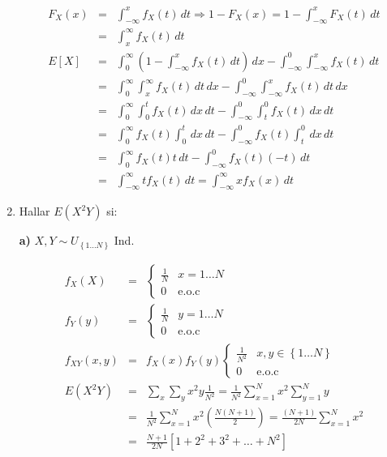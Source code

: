 \begin{enumerate}
\begin{eqnarray*} 
F_{X}\left(x \right)&=& \int_{-\infty}^{x} f_{X}\left(t \right)\, dt \Rightarrow 1-F_{X}\left( x\right)= 1 -\int_{-\infty}^{x}F_{X}\left( t\right) \, dt\\
&=& \int_{x}^{\infty} f_{X} \left( t\right)\, dt\\
E \left[X \right]&=& \int_{0}^{\infty} \left(1 - \int _{-\infty}^{x} f_{X} \left(t \right)\, dt\right)\, dx - \int_{-\infty}^{0}\int_{-\infty}^{x} f_{X} \left(t \right)\, dt\\
&=& \int_{0}^{\infty} \int_{x}^{\infty} f_{X}\left(t \right)\, dt\,dx - \int_{-\infty}^{0} \int_{-\infty}^{x} f_{X}\left(t \right)\, dt\,dx\\
&=& \int_{0}^{\infty} \int_{0}^{t} f_{X}\left(t \right)\, dx\,dt - \int_{-\infty}^{0} \int_{t}^{0} f_{X}\left(t \right)\, dx\,dt\\
&=&\int_{0}^{\infty}f_{X}\left(t \right) \int_{0}^{t} \, dx\,dt - \int_{-\infty}^{0}f_{X}\left(t \right) \int_{t}^{0} \, dx\,dt\\
&=&\int_{0}^{\infty}f_{X}\left(t \right)t \,dt - \int_{-\infty}^{0}f_{X}\left(t \right)\left(-t \right) \,dt\\
&=& \int_{-\infty}^{\infty} tf_{X}\left(t\right) \, dt = \int_{-\infty}^{\infty} x f_{X} \left(x \right)\, dt
\end{eqnarray*} 
 \item Hallar $E \left(X^2 Y \right)$ si:
 
 \smallskip
 
 \textbf{a)} $X,Y \sim U_{\left\{1 \ldots N \right\}}$ Ind.
 
 \begin{eqnarray*}
 f_{X} \left(X \right)&=& \begin{cases}
 \frac{1}{N} & x=1 \ldots N\\
 0 & \textrm{e.o.c}
 \end{cases}\\
  f_{Y} \left(y \right)&=&
 \begin{cases}
 \frac{1}{N} & y=1 \ldots N\\
 0 & \textrm{e.o.c}
 \end{cases}\\
 f_{XY} \left(x,y \right)&=& f_{X} \left(x \right)f_{Y} \left(y \right)
 \begin{cases}
 \frac{1}{N^2} & x,y \in \left\{ 1 \ldots N \right\} \\
 0 & \textrm{e.o.c}
 \end{cases}\\
 E \left(X^2 Y \right) &=& \sum_{x}\sum_{y} x^{2}y \frac{1}{N^2} = \frac{1}{N^2}\sum_{x=1}^{N} x^2 \sum_{y=1}^{N} y\\
 &=& \frac{1}{N^2}\sum_{x=1}^{N} x^2 \left(\frac{N \left( N+1\right) }{2} \right)= \frac{\left(N+1\right) }{2N} \sum_{x=1}^{N} x^2\\
 &=& \frac{N+1}{2N} \left[1+2^2+ 3^2+ \ldots + N^2 \right]
 \end{eqnarray*}
 

\end{enumerate}
